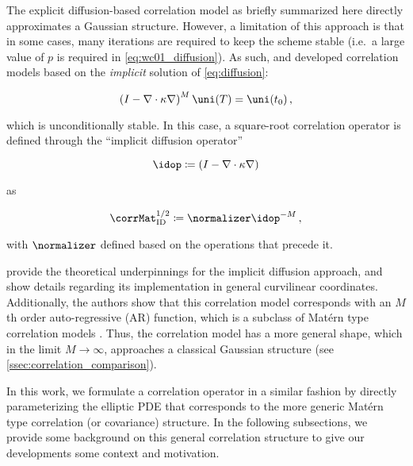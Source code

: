 \documentclass[alpha-refs]{wiley-article}
\begin{document}
The explicit diffusion-based correlation model as briefly summarized here
directly approximates a Gaussian structure.
However, a limitation of this approach is that in some cases, many
iterations are required to keep the scheme stable (i.e.\ a large value of $p$ is
required in \cref{eq:wc01_diffusion}).
As such, \citet{mirouze_representation_2010} and
\citet{carrier_background-error_2010} developed correlation models based on the
\textit{implicit} solution of \cref{eq:diffusion}:
\begin{linenomath*}\begin{equation}
    \left( I - \nabla\cdot\kappa\nabla\right)^M\uni(T) = \uni(t_0) \, ,
    \label{eq:implicit_diffusion}
\end{equation}\end{linenomath*}
which is unconditionally stable.
In this case, a square-root correlation operator is defined through the
``implicit diffusion operator''
\begin{linenomath*}\begin{equation}
    \idop \coloneqq \left(I - \nabla \cdot \kappa\nabla\right)
\end{equation}\end{linenomath*}
as
\begin{linenomath*}\begin{equation}
    \corrMat^{1/2}_\text{ID} \coloneqq \normalizer \idop^{-M} \, ,
\end{equation}\end{linenomath*}
with $\normalizer$ defined based on the operations that precede it.

\citet{mirouze_representation_2010} provide the theoretical underpinnings for
the implicit diffusion approach, and show details regarding its implementation
in general curvilinear coordinates.
Additionally, the authors show that this correlation model corresponds
with an $M$th order auto-regressive (AR) function,
which is a subclass of
Mat\'ern type correlation models \citep[see][for more description of the
parameters controlling this model]{weaver_diffusion_2013}.
Thus, the correlation model has a more general shape, which in the limit
$M\rightarrow\infty$, approaches a classical Gaussian structure (see
\cref{ssec:correlation_comparison}).

In this work, we formulate a correlation operator in a similar fashion by
directly parameterizing the
elliptic PDE that corresponds to the more generic
Mat\'ern type correlation (or covariance) structure.
In the following subsections, we provide some background on this general correlation
structure to give our developments some context and motivation.
\end{document}
